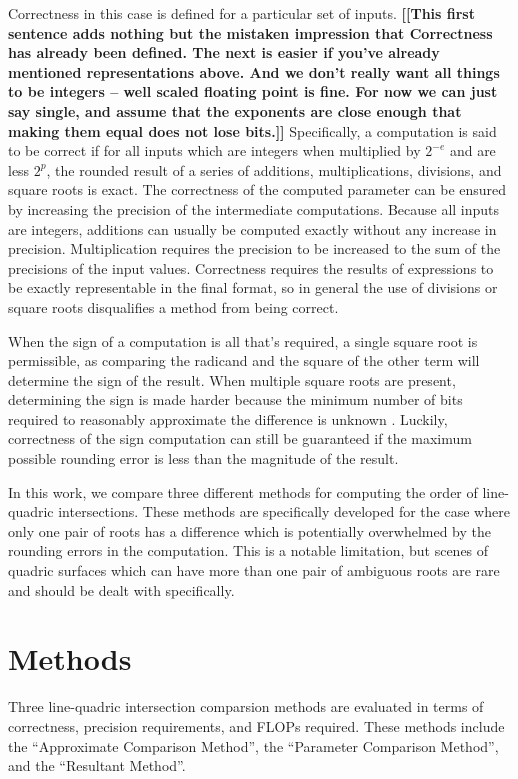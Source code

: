\documentclass{cccg16}
\def\Jack#1{{\bf [[#1]]}\ignorespaces}
\begin{document}
Correctness in this case is defined for a particular set of inputs. \Jack{This first sentence adds nothing but the mistaken impression that Correctness has already been defined.  The next is easier if you've already mentioned representations above.  And we don't really want all things to be integers -- well scaled floating point is fine.  For now we can just say single, and assume that the exponents are close enough that making them equal does not lose bits.}
Specifically, a computation is said to be correct if for all inputs
which are integers when multiplied by $2^{-e}$ and are less $2^p$, the
rounded result of a series of additions, multiplications, divisions,
and square roots is exact.  The correctness of the computed parameter
can be ensured by increasing the precision of the intermediate
computations.  Because all inputs are integers, additions can usually
be computed exactly without any increase in precision.  Multiplication
requires the precision to be increased to the sum of the precisions of
the input values.
Correctness requires the results of expressions to be exactly
representable in the final format, so in general the use of divisions
or square roots disqualifies a method from being correct.

When the sign of a computation is all that's required, a single square
root is permissible, as comparing the radicand and the square of the
other term will determine the sign of the result.
When multiple square roots are present, determining the sign is made
harder because the minimum number of bits required to reasonably
approximate the difference is unknown \cite{demaine33open}.  Luckily,
correctness of the sign computation can still be guaranteed if the
maximum possible rounding error is less than the magnitude of the
result.

In this work, we compare three different methods for computing the
order of line-quadric intersections.  These methods are specifically
developed for the case where only one pair of roots has a difference
which is potentially overwhelmed by the rounding errors in the
computation.  This is a notable limitation, but scenes of quadric
surfaces which can have more than one pair of ambiguous roots are rare
and should be dealt with specifically.

\section{Methods}
Three line-quadric intersection comparsion methods are evaluated in
terms of correctness, precision requirements, and FLOPs required.
These methods include the ``Approximate Comparison Method'', the
``Parameter Comparison Method'', and the ``Resultant Method''.
\end{document}
